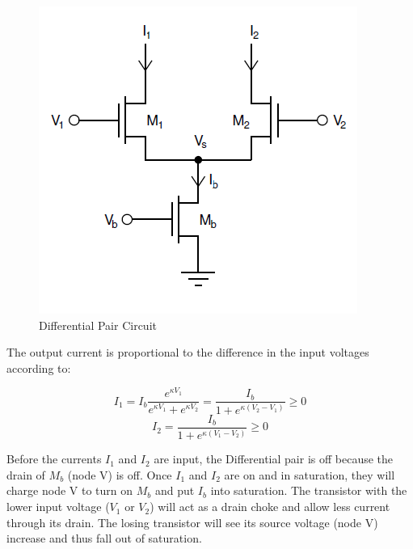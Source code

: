 \begin{figure}[htbp]
  \centering
  \includegraphics[scale=0.8]{pics/Differential_pair_circuit.png}
  \caption{Differential Pair Circuit}
  \label{fig:Differential_pair_circuit}
\end{figure}


The output current is proportional to the difference in the input voltages according to: 

\begin{equation}
I_1 = I_b\frac{e^{\kappa V_1}}{e^{ \kappa V_1}+e^{\kappa V_2}} = \frac{I_b}{1+ e^{\kappa(V_2-V_1)}}  \geq 0
\end{equation}
\begin{equation}
I_2 = \frac{I_b}{1+e^{\kappa(V_1-V_2)}} \geq 0
\end{equation}

Before the currents $I_1$ and $I_2$ are input, the Differential pair is off because the drain of $M_b$ (node V) is off. Once $I_1$ and $I_2$ are on and in saturation, they will charge node V to turn on $M_b$ and put $I_b$ into saturation. The transistor with the lower input voltage ($V_1$ or $V_2$) will act as a drain choke and allow less current through its drain. The losing transistor will see its source voltage (node V) increase and thus fall out of saturation. 


